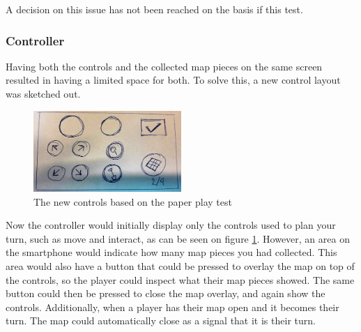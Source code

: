 A decision on this issue has not been reached on the basis if this test.

\subsubsection{Controller}
Having both the controls and the collected map pieces on the same screen resulted in having a limited space for both. To solve this, a new control layout was sketched out.

\begin{figure}[h]
\centering
\includegraphics[width=0.5\textwidth]{figures/RevisedControl} 
\caption{The new controls based on the paper play test}\label{fig:PPtest4}
\end{figure}

Now the controller would initially display only the controls used to plan your turn, such as move and interact, as can be seen on figure \ref{fig:PPtest4}. However, an area on the smartphone would indicate how many map pieces you had collected. This area would also have a button that could be pressed to overlay the map on top of the controls, so the player could inspect what their map pieces showed. The same button could then be pressed to close the map overlay, and again show the controls. Additionally, when a player has their map open and it becomes their turn. The map could automatically close as a signal that it is their turn.


